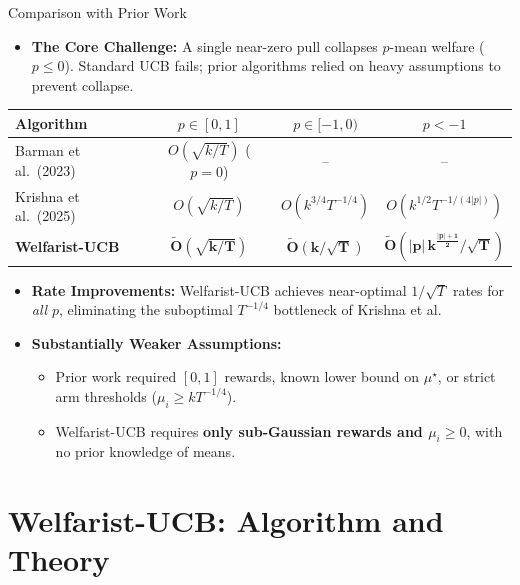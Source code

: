 \documentclass[11pt]{beamer}
\newcommand{\mus}{\mu^{\star}}
\begin{document}
\begin{frame}{Comparison with Prior Work}
  \small
  \begin{itemize}
    \item \textbf{The Core Challenge:} A single near-zero pull collapses $p$-mean welfare ($p \le 0$). Standard UCB fails; prior algorithms relied on heavy assumptions to prevent collapse.
  \end{itemize}

  \vspace{2pt}
  \centering
  \small
  \setlength{\tabcolsep}{4pt}
  \begin{tabular}{lccc}
    \toprule
    Algorithm & $p\in[0,1]$ & $p\in[-1,0)$ & $p<-1$ \\
    \midrule
    Barman et al.\ (2023) & $O(\sqrt{k/T})$ \scriptsize{($p=0$)} & -- & -- \\
    Krishna et al.\ (2025) & $O(\sqrt{k/T})$ & $O(k^{3/4}T^{-1/4})$ & $O(k^{1/2}T^{-1/(4|p|)})$ \\
    \textbf{Welfarist-UCB} & $\mathbf{\tilde{O}(\sqrt{k/T})}$ & $\mathbf{\tilde{O}(k/\sqrt{T})}$ & $\mathbf{\tilde{O}(|p|\,k^{\frac{|p|+1}{2}}/\sqrt{T})}$ \\
    \bottomrule
  \end{tabular}

  \vspace{4pt}
  \raggedright
  \small
  \begin{itemize}
    \item \textbf{Rate Improvements:} Welfarist-UCB achieves near-optimal $1/\sqrt{T}$ rates for \emph{all} $p$, eliminating the suboptimal $T^{-1/4}$ bottleneck of Krishna et al.
    \item \textbf{Substantially Weaker Assumptions:}
      \begin{itemize}\footnotesize
        \item Prior work required $[0,1]$ rewards, known lower bound on $\mus$, or strict arm thresholds ($\mu_i \ge k T^{-1/4}$).
        \item Welfarist-UCB requires \textbf{only sub-Gaussian rewards and $\mu_i \ge 0$}, with no prior knowledge of means.
      \end{itemize}
  \end{itemize}
\end{frame}

\section{Welfarist-UCB: Algorithm and Theory}
\end{document}
